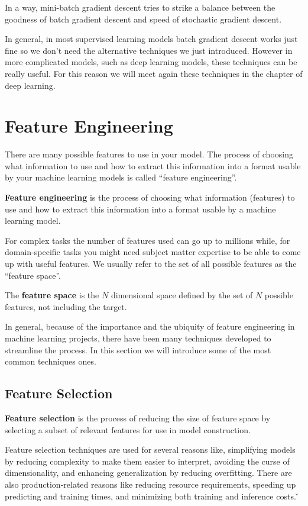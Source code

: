 In a way, mini-batch gradient descent tries to strike a balance between the goodness of batch gradient descent and
speed of stochastic gradient descent.
\eit

In general, in most supervised learning models batch gradient descent works just fine so we don't need the
alternative techniques we just introduced. However in more complicated models, such as deep learning models, these
techniques can be really useful. For this reason we will meet again these techniques in the chapter of deep learning.

\section{Feature Engineering}

There are many possible features to use in your model. The process of choosing what information to use and how to
extract this information into a format usable by your machine learning models is called ``feature engineering''.

\textbf{Feature engineering} is the process of choosing what information (features) to use and how to extract this
information into a format usable by a machine learning model.
\ed

For complex tasks the number of features used can go up to millions while, for domain-specific tasks you might need
subject matter expertise to be able to come up with useful features. We usually refer to the set of all possible
features as the ``feature space''.

The \textbf{feature space} is the $N$ dimensional space defined by the set of $N$ possible features, not including
the target.
\ed

In general, because of the importance and the ubiquity of feature engineering in machine learning projects, there
have been many techniques developed to streamline the process. In this section we will introduce some of the most
common techniques ones.

\subsection{Feature Selection}

\textbf{Feature selection} is the process of reducing the size of feature space by selecting a subset of relevant
features for use in model construction.
\ed

Feature selection techniques are used for several reasons like, simplifying models by reducing complexity to make
them easier to interpret, avoiding the curse of dimensionality, and enhancing generalization by reducing overfitting.
There are also production-related reasons like reducing resource requirements, speeding up predicting and training
times, and minimizing both training and inference costs. \v

